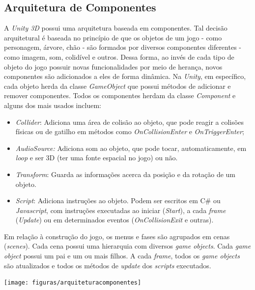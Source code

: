 \subsection{Arquitetura de Componentes}

A \textit{Unity 3D} possui uma arquitetura baseada em componentes. Tal decisão arquitetural é baseada no princípio de que os objetos de um jogo - como personagem, árvore, chão - são formados por diversos componentes diferentes - como imagem, som, colidível e outros. Dessa forma, ao invés de cada tipo de objeto do jogo possuir novas funcionalidades por meio de herança, novos componentes são adicionados a eles de forma dinâmica. Na \textit{Unity}, em específico, cada objeto herda da classe \textit{GameObject} que possui métodos de adicionar e remover componentes. Todos os componentes herdam da classe \textit{Component} e alguns dos mais usados incluem:

\begin{itemize}
\item \textit{Collider}: Adiciona uma área de colisão ao objeto, que pode reagir a colisões físicas ou de gatilho em métodos como \textit{OnCollisionEnter} e \textit{OnTriggerEnter};
\item \textit{AudioSource:} Adiciona som ao objeto, que pode tocar, automaticamente, em \textit{loop} e ser 3D (ter uma fonte espacial no jogo) ou não.
\item \textit{Transform}: Guarda as informações acerca da posição e da rotação de um objeto.
\item \textit{Script}: Adiciona instruções ao objeto. Podem ser escritos em C\# ou \textit{Javascript}, com instruções executadas ao iniciar (\textit{Start}), a cada \textit{frame} (\textit{Update}) ou em determinados eventos (\textit{OnCollisionExit} e outras).
\end{itemize}

Em relação à construção do jogo, os menus e fases são agrupados em cenas (\textit{scenes}). Cada cena possui uma hierarquia com diversos \textit{game objects}. Cada \textit{game object} possui um pai e um ou mais filhos. A cada \textit{frame}, todos os \textit{game objects} são atualizados e todos os métodos de \textit{update} dos \textit{scripts} executados.

\begin{center}
	\texttt{[image: figuras/arquiteturacomponentes]}
	\label{figura:arquiteturacomponentes}
\end{center}

